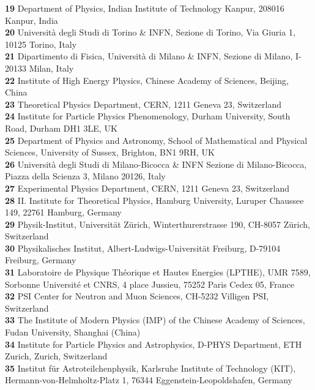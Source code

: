 \documentclass{SciPost_better_arXiv}
\begin{document}
\begin{center}
{  {\bf 19} Department of Physics, Indian Institute of Technology Kanpur, 208016 Kanpur, India\\
  {\bf 20} Universit\`{a} degli Studi di Torino \& INFN, Sezione di Torino, Via Giuria 1, 10125 Torino, Italy\\
  {\bf 21} Dipartimento di Fisica, Universit\`{a} di Milano \& INFN, Sezione di Milano, I-20133 Milan, Italy\\
  {\bf 22} Institute of High Energy Physics, Chinese Academy of Sciences, Beijing, China\\
  {\bf 23} Theoretical Physics Department, CERN, 1211 Geneva 23, Switzerland\\
  {\bf 24} Institute for Particle Physics Phenomenology, Durham University, South Road, Durham DH1 3LE, UK\\
  {\bf 25} Department of Physics and Astronomy, School of Mathematical and Physical Sciences, University of Sussex, Brighton, BN1 9RH, UK\\
  {\bf 26} Universit\`{a} degli Studi di Milano-Bicocca \& INFN Sezione di Milano-Bicocca, Piazza della Scienza 3, Milano 20126, Italy\\
  {\bf 27} Experimental Physics Department, CERN, 1211 Geneva 23, Switzerland\\
  {\bf 28} II. Institute for Theoretical Physics, Hamburg University, Luruper Chaussee 149, 22761 Hamburg, Germany\\
  {\bf 29} Physik-Institut, Universit\"at Z\"urich, Winterthurerstrasse 190, CH-8057 Z\"urich, Switzerland\\
  {\bf 30} Physikalisches Institut, Albert-Ludwigs-Universit\"at Freiburg, D-79104 Freiburg, Germany\\
  {\bf 31} Laboratoire de Physique Th\'eorique et Hautes Energies (LPTHE), UMR 7589, Sorbonne Universit\'e et CNRS, 4 place Jussieu, 75252 Paris Cedex 05, France\\
  {\bf 32} PSI Center for Neutron and Muon Sciences, CH-5232 Villigen PSI, Switzerland\\
  {\bf 33} The Institute of Modern Physics (IMP) of the Chinese Academy of Sciences, Fudan University, Shanghai (China)\\
  {\bf 34} Institute for Particle Physics and Astrophysics, D-PHYS Department, ETH Zurich, Zurich, Switzerland\\
  {\bf 35} Institut f\"ur Astroteilchenphysik, Karlsruhe Institute of Technology (KIT), Hermann-von-Helmholtz-Platz 1, 76344 Eggenstein-Leopoldshafen, Germany\\
}
\end{center}
\end{document}
